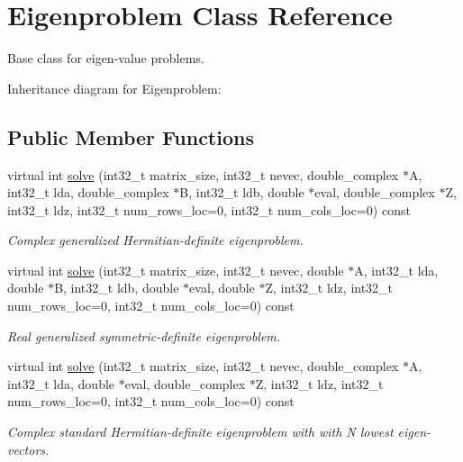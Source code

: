 \hypertarget{class_eigenproblem}{}\section{Eigenproblem Class Reference}
\label{class_eigenproblem}


Base class for eigen-\/value problems.  




Inheritance diagram for Eigenproblem\+:
\subsection*{Public Member Functions}
\begin{DoxyCompactItemize}
\item 
virtual int \hyperlink{class_eigenproblem_ac21f076d0d055610bbf8b26db34fb055}{solve} (int32\+\_\+t matrix\+\_\+size, int32\+\_\+t nevec, double\+\_\+complex $\ast$A, int32\+\_\+t lda, double\+\_\+complex $\ast$B, int32\+\_\+t ldb, double $\ast$eval, double\+\_\+complex $\ast$Z, int32\+\_\+t ldz, int32\+\_\+t num\+\_\+rows\+\_\+loc=0, int32\+\_\+t num\+\_\+cols\+\_\+loc=0) const 
\begin{DoxyCompactList}\small\item\em Complex generalized Hermitian-\/definite eigenproblem. \end{DoxyCompactList}\item 
virtual int \hyperlink{class_eigenproblem_ad09807942eeec6c4c6db801a561332ce}{solve} (int32\+\_\+t matrix\+\_\+size, int32\+\_\+t nevec, double $\ast$A, int32\+\_\+t lda, double $\ast$B, int32\+\_\+t ldb, double $\ast$eval, double $\ast$Z, int32\+\_\+t ldz, int32\+\_\+t num\+\_\+rows\+\_\+loc=0, int32\+\_\+t num\+\_\+cols\+\_\+loc=0) const 
\begin{DoxyCompactList}\small\item\em Real generalized symmetric-\/definite eigenproblem. \end{DoxyCompactList}\item 
virtual int \hyperlink{class_eigenproblem_a08bbface2f39311674aa0fbee42610be}{solve} (int32\+\_\+t matrix\+\_\+size, int32\+\_\+t nevec, double\+\_\+complex $\ast$A, int32\+\_\+t lda, double $\ast$eval, double\+\_\+complex $\ast$Z, int32\+\_\+t ldz, int32\+\_\+t num\+\_\+rows\+\_\+loc=0, int32\+\_\+t num\+\_\+cols\+\_\+loc=0) const 
\begin{DoxyCompactList}\small\item\em Complex standard Hermitian-\/definite eigenproblem with with N lowest eigen-\/vectors. \end{DoxyCompactList}\item 

\end{DoxyCompactItemize}
